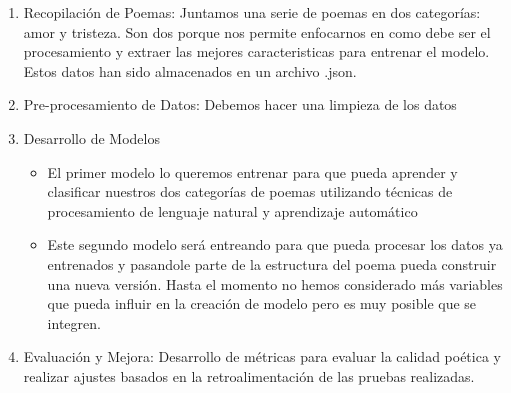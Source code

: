 \begin{enumerate}
    \item Recopilación de Poemas: Juntamos una serie de poemas en dos categorías: amor y tristeza. 
    Son dos porque nos permite enfocarnos en como debe ser el procesamiento y extraer las mejores
    caracteristicas para entrenar el modelo. Estos datos han sido almacenados en un archivo .json. 
    
    \item Pre-procesamiento de Datos: Debemos hacer una limpieza de los datos
    
    \item Desarrollo de Modelos
    
    \begin{itemize}
        \item El primer modelo lo queremos entrenar para que pueda aprender 
        y clasificar nuestros dos categorías de poemas utilizando técnicas de procesamiento de 
        lenguaje natural y aprendizaje automático        

        \item Este segundo modelo será entreando para que pueda procesar los datos ya entrenados
        y pasandole parte de la estructura del poema pueda construir una nueva versión. Hasta 
        el momento no hemos considerado más variables que pueda influir en la creación de 
        modelo pero es muy posible que se integren.
    \end{itemize}    

    \item Evaluación y Mejora: Desarrollo de métricas para evaluar la calidad poética y realizar ajustes 
    basados en la retroalimentación de las pruebas realizadas.
\end{enumerate}